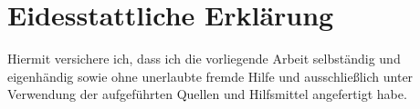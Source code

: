 \chapter*{\LARGE Eidesstattliche Erklärung}
Hiermit versichere ich, dass ich die vorliegende Arbeit selbständig und eigenhändig sowie
ohne unerlaubte fremde Hilfe und ausschließlich unter Verwendung der aufgeführten
Quellen und Hilfsmittel angefertigt habe.


\vspace{30mm}
\hfill{}
\newpage
